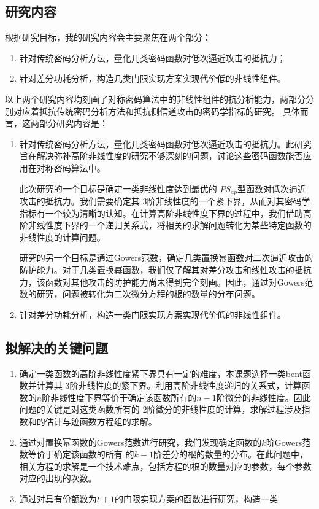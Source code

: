 \documentclass[a4paper,zihao=-4,AutoFakeBold]{ctexart}
\begin{document}
\subsection{研究内容}
根据研究目标，我的研究内容会主要聚焦在两个部分：
\begin{enumerate}[label=(\arabic{*})]
    \item 针对传统密码分析方法，量化几类密码函数对低次逼近攻击的抵抗力；
    \item 针对差分功耗分析，构造几类门限实现方案实现代价低的非线性组件。
\end{enumerate}
以上两个研究内容均刻画了对称密码算法中的非线性组件的抗分析能力，两部分分别对应着抵抗传统密码分析方法和抵抗侧信道攻击的密码学指标的研究。
具体而言，这两部分研究内容是：
\begin{enumerate}[label=(\arabic{*})]
    \item 针对传统密码分析方法，量化几类密码函数对低次逼近攻击的抵抗力。此研究旨在解决弥补高阶非线性度的研究不够深刻的问题，讨论这些密码函数能否应用在对称密码算法中。
    
    此次研究的一个目标是确定一类非线性度达到最优的 $PS_{ap}$型函数对低次逼近攻击的抵抗力。我们需要确定其 $3$阶非线性度的一个紧下界，从而对其密码学指标有一个较为清晰的认知。在计算高阶非线性度下界的过程中，我们借助高阶非线性度下界的一个递归关系式，将相关的求解问题转化为某些特定函数的非线性度的计算问题。

    研究的另一个目标是通过Gowers范数，确定几类置换幂函数对二次逼近攻击的防护能力。对于几类置换幂函数，我们仅了解其对差分攻击和线性攻击的抵抗力，该函数对其他攻击的防护能力尚未得到完全刻画。因此，通过对Gowers范数的研究，问题被转化为二次微分方程的根的数量的分布问题。
    \item 针对差分功耗分析，构造一类门限实现方案实现代价低的非线性组件。
\end{enumerate}
\subsection{拟解决的关键问题}
\begin{enumerate}[label=(\arabic{*})]
    \item 确定一类函数的高阶非线性度紧下界具有一定的难度，本课题选择一类bent函数并计算其 $3$阶非线性度的紧下界。利用高阶非线性度递归的关系式，计算函数的$n$阶非线性度下界等价于确定该函数所有的$n-1$阶微分的非线性度。因此问题的关键是对这类函数所有的 $2$阶微分的非线性度的计算，求解过程涉及指数和的估计与迹函数方程组的求解。
    \item 通过对置换幂函数的Gowers范数进行研究，我们发现确定函数的$k$阶Gowers范数等价于确定该函数的所有 的$k-1$阶差分的根的数量的分布。在此问题中，相关方程的求解是一个技术难点，包括方程的根的数量对应的参数，每个参数对应的出现的次数。
    \item 通过对具有份额数为$t+1$的门限实现方案的函数进行研究，构造一类
\end{enumerate}
\end{document}
